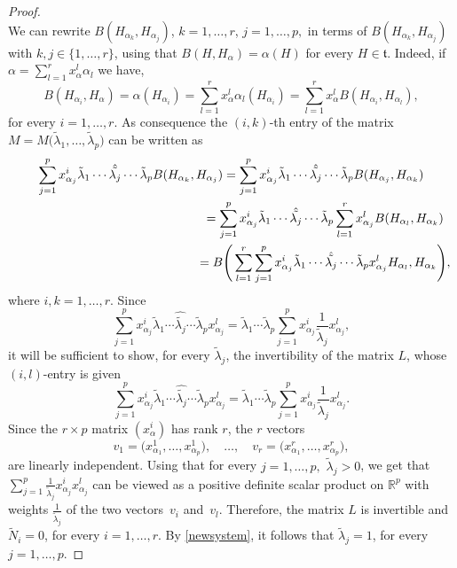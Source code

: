 \documentclass[10pt,a4paper]{article}
\numberwithin{equation}{section}
\theoremstyle{definition}
\begin{document}
\begin{proof}
\[\]
We can rewrite $B(H_{\alpha_k}, H_{\alpha_j})$, $k =1, \dots, r$, $j = 1, \dots, p,$ in terms of $B(H_{\alpha_k}, H_{\alpha_j})$ with $k, j \in \{1, \dots, r \}$, using
 that $B (H, H_{\alpha}) = \alpha (H)$ for every $H \in \mathfrak t$. Indeed, if $\alpha = \sum_{l=1}^r x_{\alpha}^l \alpha_l$ we have,
\[
B (H_{\alpha_i}, H_{\alpha}) = \alpha (H_{\alpha_i}) =
 \sum_{l=1}^r x_{\alpha}^l \alpha_l (H_{\alpha_i}) = \sum_{l=1}^r x_{\alpha}^l B(H_{\alpha_i}, H_{\alpha_l}),
\]
 for every $i = 1, \dots, r$.
 As consequence the $(i,k)$-th entry of the matrix $M = M\big(\tilde \lambda_1, \dots, \tilde \lambda_p\big)$ can be written as
\begin{gather*}
\sum_{j=1}^p x_{\alpha_j}^i \tilde \lambda_1 \cdots \hat{\tilde {\lambda_j}} \cdots \tilde \lambda _p B(H_{\alpha_k}, H_{\alpha_j}) = \sum_{j=1}^p x_{\alpha_j}^i \tilde \lambda_1 \cdots \hat{\tilde {\lambda_j}} \cdots \tilde \lambda _p B(H_{\alpha_j}, H_{\alpha_k})\\
\hphantom{\sum_{j=1}^p x_{\alpha_j}^i \tilde \lambda_1 \cdots \hat{\tilde {\lambda_j}} \cdots \tilde \lambda _p B(H_{\alpha_k}, H_{\alpha_j})}{} = \sum_{j=1}^p x_{\alpha_j}^i \tilde \lambda_1 \cdots \hat{\tilde {\lambda_j}} \cdots \tilde \lambda _p \sum_{l=1}^r x_{\alpha_j}^l B(H_{\alpha_l}, H_{\alpha_k})\\
 \hphantom{\sum_{j=1}^p x_{\alpha_j}^i \tilde \lambda_1 \cdots \hat{\tilde {\lambda_j}} \cdots \tilde \lambda _p B(H_{\alpha_k}, H_{\alpha_j})}{} = B\Bigg( \sum_{l=1}^r \sum_{j=1}^p x_{\alpha_j}^i \tilde \lambda_1 \cdots \hat{\tilde {\lambda_j}} \cdots \tilde \lambda _p x_{\alpha_j}^l H_{\alpha_l}, H_{\alpha_k}\Bigg),
\end{gather*}
where $i , k = 1, \dots, r$. Since
\[
 \sum_{j=1}^p x_{\alpha_j}^i \tilde \lambda_1 \cdots \hat{\tilde {\lambda_j}} \cdots \tilde \lambda _p x_{\alpha_j}^l = \tilde \lambda_1 \cdots \tilde \lambda_p \sum_{j=1}^p x_{\alpha_j}^i \frac{1} { \tilde \lambda_j} x_{\alpha_j}^l,
\]
 it will be sufficient to show, for every $ \tilde \lambda_j$, the invertibility of the matrix $L$, whose $(i,l)$-entry is given
\[
 \sum_{j=1}^p x_{\alpha_j}^i \tilde \lambda_1 \cdots \hat{\tilde {\lambda_j}} \cdots \tilde \lambda _p x_{\alpha_j}^l = \tilde \lambda_1 \cdots \tilde \lambda_p \sum_{j=1}^p x_{\alpha_j}^i \frac{1} {\tilde \lambda_j} x_{\alpha_j}^l.
\]
Since the $r \times p$ matrix $(x_{\alpha}^i)$ has rank $r$, the $r$ vectors
\[
v_1 = \big(x^1_{\alpha_1}, \dots, x^1_{\alpha_p}\big), \quad \dots, \quad v_r = \big(x^r_{\alpha_1}, \dots, x^r_{\alpha_p}\big),
\]
are linearly independent. Using that for every $j=1, \dots, p,$ $ \tilde \lambda_j > 0$, we get that $\sum_{j=1}^p \frac{1} { \tilde \lambda_j} x_{\alpha_j}^i x_{\alpha_j}^l $ can be viewed as a positive definite scalar product on $\mathbb R^p$ with weights $\frac{1}{ \tilde \lambda_j}$ of the two vectors~$v_i$ and~$v_l$. Therefore,
the matrix $L$ is invertible and $\tilde N_i =0$, for every $i = 1, \dots, r$. By \eqref{newsystem}, it follows that $\tilde \lambda_j = 1$, for every $j =1, \dots, p$.
\end{proof}
\end{document}
